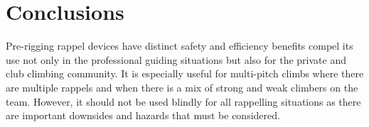 \documentclass[nonacm,acmtog]{acmart}
\begin{document}
\section{Conclusions}
\label{sec:conclusion}

  Pre-rigging rappel devices have distinct safety and efficiency benefits
  compel its use not only in the professional guiding situations but also for
  the private and club climbing community. It is especially useful for
  multi-pitch climbs where there are multiple rappels and when there is a mix
  of strong and weak climbers on the team.  However, it should not be used
  blindly for all rappelling situations as there are important downsides and
  hazards that must be considered.



\end{document}
